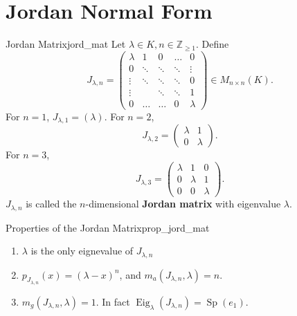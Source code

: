 % 
%
%
%

\section{Jordan Normal Form}

\begin{definition}{Jordan Matrix}{jord_mat}
	Let $\lambda \in K, n \in \mathbb{Z}_{\geq 1}$. Define
	\[
		J_{\lambda , n} = 
		\begin{pmatrix}
			\lambda & 1 & 0 & \hdots  & 0\\
			0 & \ddots & \ddots & \ddots & \vdots\\
			\vdots & \ddots & \ddots & \ddots  & 0\\
			\vdots  &  & \ddots & \ddots & 1\\
			0 & \hdots & \hdots & 0 & \lambda 
		\end{pmatrix} \in M_{n\times n}(K).
	\]
	For $n = 1$, $J_{\lambda, 1} = (\lambda)$. For $n = 2$,
	\[
		J_{\lambda, 2} = 
		\begin{pmatrix}
			\lambda & 1\\
			0 & \lambda
		\end{pmatrix}.
	\]
	For $n = 3$,
	\[
		J_{\lambda, 3} = 
		\begin{pmatrix}
			\lambda & 1 & 0\\
			0 & \lambda & 1\\
			0 & 0 & \lambda
		\end{pmatrix}.
	\]
	$J_{\lambda, n}$ is called the $n$-dimensional \textbf{Jordan matrix} with eigenvalue $\lambda$.
\end{definition}

\begin{lemma}{Properties of the Jordan Matrix}{prop_jord_mat}
	\begin{enumerate}
		\item $\lambda$ is the only eignevalue of $J_{\lambda, n}$
		\item $p_{J_{\lambda,n}}(x) = (\lambda - x)^n$, and $m_a(J_{\lambda, n}, \lambda) = n$.
		\item $m_g(J_{\lambda, n}, \lambda) = 1$. In fact $\operatorname{Eig}_{\lambda}(J_{\lambda, n}) = \operatorname{Sp}(e_1)$.
	\end{enumerate}
\end{lemma}

